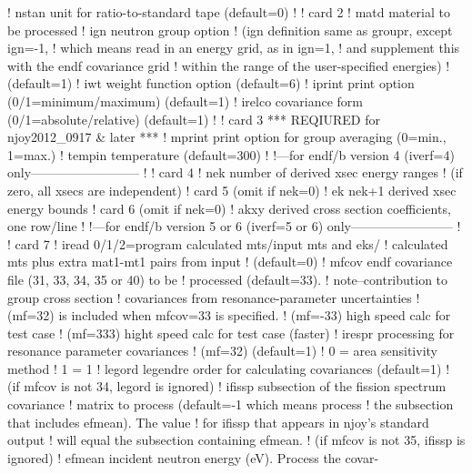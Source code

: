 \begin{ccode}
   !    nstan   unit for ratio-to-standard tape (default=0)
   !
   !  card 2
   !    matd    material to be processed
   !    ign     neutron group option
   !            (ign definition same as groupr, except ign=-1,
   !            which means read in an energy grid, as in ign=1,
   !            and supplement this with the endf covariance grid
   !            within the range of the user-specified energies)
   !            (default=1)
   !    iwt     weight function option (default=6)
   !    iprint  print option (0/1=minimum/maximum) (default=1)
   !    irelco  covariance form (0/1=absolute/relative) (default=1)
   !
   !  card 3    *** REQIURED for njoy2012_0917 & later ***
   !    mprint  print option for group averaging (0=min., 1=max.)
   !    tempin  temperature (default=300)
   !
   !---for endf/b version 4 (iverf=4) only--------------------------
   !
   !  card 4
   !    nek     number of derived xsec energy ranges
   !            (if zero, all xsecs are independent)
   !  card 5    (omit if nek=0)
   !    ek      nek+1 derived xsec energy bounds
   !  card 6    (omit if nek=0)
   !    akxy    derived cross section coefficients, one row/line
   !
   !---for endf/b version 5 or 6 (iverf=5 or 6) only------------------------
   !
   !  card 7
   !    iread   0/1/2=program calculated mts/input mts and eks/
   !            calculated mts plus extra mat1-mt1 pairs from input
   !            (default=0)
   !    mfcov   endf covariance file (31, 33, 34, 35 or 40) to be
   !            processed (default=33).
   !            note--contribution to group cross section
   !            covariances from resonance-parameter uncertainties
   !            (mf=32) is included when mfcov=33 is specified.
   !            (mf=-33) high speed calc for test case
   !            (mf=333) hight speed calc for test case (faster)
   !    irespr  processing for resonance parameter covariances
   !            (mf=32) (default=1)
   !            0 = area sensitivity method
   !            1 = 1%
   !    legord  legendre order for calculating covariances (default=1)
   !            (if mfcov is not 34, legord is ignored)
   !    ifissp  subsection of the fission spectrum covariance
   !            matrix to process (default=-1 which means process
   !            the subsection that includes efmean).  The value
   !            for ifissp that appears in njoy's standard output
   !            will equal the subsection containing efmean.
   !            (if mfcov is not 35, ifissp is ignored)
   !    efmean  incident neutron energy (eV).  Process the covar-

\end{ccode}
